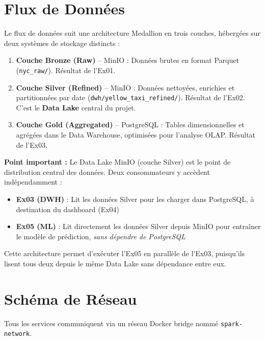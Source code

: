\documentclass[12pt,a4paper]{report}
\begin{document}
\section{Flux de Données}

Le flux de données suit une architecture Medallion en trois couches, hébergées sur deux systèmes de stockage distincts :

\begin{enumerate}
    \item \textbf{Couche Bronze (Raw)} -- MinIO : Données brutes en format Parquet (\texttt{nyc\_raw/}). Résultat de l'Ex01.
    \item \textbf{Couche Silver (Refined)} -- MinIO : Données nettoyées, enrichies et partitionnées par date (\texttt{dwh/yellow\_taxi\_refined/}). Résultat de l'Ex02. C'est le \textbf{Data Lake} central du projet.
    \item \textbf{Couche Gold (Aggregated)} -- PostgreSQL : Tables dimensionnelles et agrégées dans le Data Warehouse, optimisées pour l'analyse OLAP. Résultat de l'Ex03.
\end{enumerate}

\vspace{0.5cm}
\noindent\textbf{Point important :} Le Data Lake MinIO (couche Silver) est le point de distribution central des données. Deux consommateurs y accèdent indépendamment :

\begin{itemize}
    \item \textbf{Ex03 (DWH)} : Lit les données Silver pour les charger dans PostgreSQL, à destination du dashboard (Ex04)
    \item \textbf{Ex05 (ML)} : Lit directement les données Silver depuis MinIO pour entraîner le modèle de prédiction, \textit{sans dépendre de PostgreSQL}
\end{itemize}

Cette architecture permet d'exécuter l'Ex05 en parallèle de l'Ex03, puisqu'ils lisent tous deux depuis le même Data Lake sans dépendance entre eux.

\section{Schéma de Réseau}

Tous les services communiquent via un réseau Docker bridge nommé \texttt{spark-network}.
\end{document}
